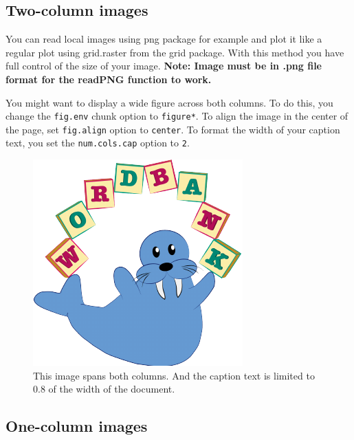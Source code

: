 \documentclass[10pt, letterpaper]{article}
\newenvironment{CodeChunk}{}{}
\begin{document}
\subsection{Two-column images}\label{two-column-images}

You can read local images using png package for example and plot it like
a regular plot using grid.raster from the grid package. With this method
you have full control of the size of your image. \textbf{Note: Image
must be in .png file format for the readPNG function to work.}

You might want to display a wide figure across both columns. To do this,
you change the \texttt{fig.env} chunk option to \texttt{figure*}. To
align the image in the center of the page, set \texttt{fig.align} option
to \texttt{center}. To format the width of your caption text, you set
the \texttt{num.cols.cap} option to \texttt{2}.

\begin{CodeChunk}
\captionsetup{width=0.8\textwidth}\begin{figure}[h]

{\centering \includegraphics{figs/2-col-image-1} 

}

\caption[This image spans both columns]{This image spans both columns. And the caption text is limited to 0.8 of the width of the document.}\label{fig:2-col-image}
\end{figure}
\end{CodeChunk}

\subsection{One-column images}\label{one-column-images}
\end{document}
